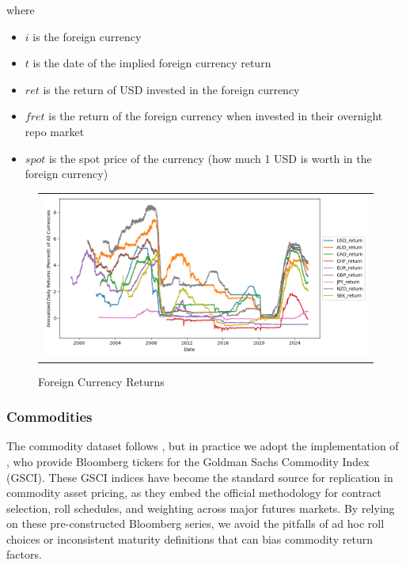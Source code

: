 \documentclass{article}
\begin{document}
\begin{appendices}
where
\begin{itemize}
 \item $i$ is the foreign currency
 \item $t$ is the date of the implied foreign currency return
 \item $ret$ is the return of USD invested in the foreign currency
 \item $fret$ is the return of the foreign currency when invested in their overnight repo market
 \item $spot$ is the spot price of the currency (how much 1 USD is worth in the foreign currency)
\end{itemize}

\begin{figure}
  \centering
  \begin{tabular}{@{}c@{}}
    \includegraphics[width=.95\linewidth]{../docs_src/FX_returns.png} \\[\abovecaptionskip]
  \end{tabular}

  \caption{Foreign Currency Returns}
  \label{fig:fx_returns}
\end{figure}

\FloatBarrier

\subsubsection{Commodities}
\label{sec:commodities}
The commodity dataset follows \cite{Yang2013}, but in practice we adopt the 
implementation of \cite{Koijen2018}, who provide Bloomberg tickers for the 
Goldman Sachs Commodity Index (GSCI). These GSCI indices have become the 
standard source for replication in commodity asset pricing, as they embed the 
official methodology for contract selection, roll schedules, and weighting 
across major futures markets. By relying on these pre-constructed Bloomberg 
series, we avoid the pitfalls of ad hoc roll choices or inconsistent maturity 
definitions that can bias commodity return factors.


\end{appendices}
\end{document}
